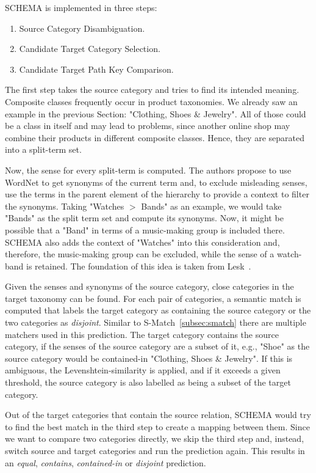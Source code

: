 SCHEMA is implemented in three steps:
\begin{enumerate}
    \item Source Category Disambiguation.
    \item Candidate Target Category Selection.
    \item Candidate Target Path Key Comparison.
\end{enumerate}
The first step takes the source category and tries to find its intended meaning.
Composite classes frequently occur in product taxonomies.
We already saw an example in the previous Section: "Clothing, Shoes \& Jewelry".
All of those could be a class in itself and may lead to problems, since another online shop may
combine their products in different composite classes.
Hence, they are separated into a split-term set.

Now, the sense for every split-term is computed.
The authors propose to use WordNet to get synonyms of the current term and, to exclude misleading senses,
use the terms in the parent element of the hierarchy to provide a context to filter the synonyms.
Taking "Watches $>$ Bands" as an example, we would take "Bands" as the split term set and compute its synonyms.
Now, it might be possible that a "Band" in terms of a music-making group is included there.
SCHEMA also adds the context of "Watches" into this consideration and, therefore, the music-making group
can be excluded, while the sense of a watch-band is retained.
The foundation of this idea is taken from Lesk~\cite{lesk1986automatic}.

Given the senses and synonyms of the source category, close categories in the target taxonomy can be found.
For each pair of categories, a semantic match is computed that labels the target category as containing the
source category or the two categories as \emph{disjoint}.
Similar to S-Match~\ref{subsec:smatch} there are multiple matchers used in this prediction.
The target category contains the source category, if the senses of the source category are a subset of it, e.g.,
"Shoe" as the source category would be contained-in "Clothing, Shoes \& Jewelry".
If this is ambiguous, the Levenshtein-similarity is applied, and if it exceeds a given threshold,
the source category is also labelled as being a subset of the target category.

Out of the target categories that contain the source relation, SCHEMA would try to find the best match in the third
step to create a mapping between them.
Since we want to compare two categories directly, we skip the third step and, instead, switch source and target categories
and run the prediction again.
This results in an \emph{equal}, \emph{contains}, \emph{contained-in} or \emph{disjoint} prediction.

